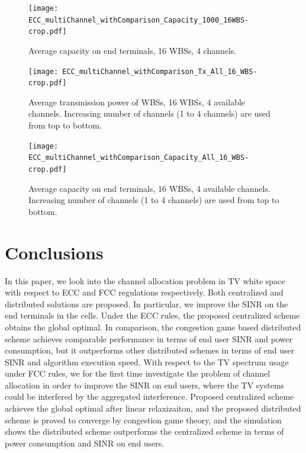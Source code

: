 \documentclass[times]{ettauth}
\theoremstyle{mytheoremstyle}
\theoremstyle{mytheoremstyle}
\theoremstyle{mytheoremstyle}
\begin{document}
       \begin{figure}[h!]
       \centering
       \texttt{[image: ECC\_multiChannel\_withComparison\_Capacity\_1000\_16WBS-crop.pdf]}
       \caption{Average capacity on end terminals,  16 WBSs, 4 channels.}
	\label{ECC_multiChannel_Capacity2}
     \end{figure}
 \begin{figure}[h!]
    \centering
      \texttt{[image: ECC\_multiChannel\_withComparison\_Tx\_All\_16\_WBS-crop.pdf]}
    \caption{Average transmission power of WBSs,  16 WBSs, 4 available channels. Increasing number of channels (1 to 4 channels) are used from top to bottom.}
\label{transPower2_each_cell}    
  \end{figure}
  
       \begin{figure}[h!]
       \centering
       \texttt{[image: ECC\_multiChannel\_withComparison\_Capacity\_All\_16\_WBS-crop.pdf]}
       \caption{Average capacity on end terminals,  16 WBSs, 4 available channels. Increasing number of channels (1 to 4 channels) are used from top to bottom.}
	\label{ECC_multiChannel_Capacity2_each_cell}
     \end{figure}


\section{Conclusions}
In this paper, we look into the channel allocation problem in TV white space with respect to ECC and FCC regulations respectively.
Both centralized and distributed solutions are proposed. 
In particular, we improve the SINR on the end terminals in the cells.
Under the ECC rules, the proposed centralized scheme obtains the global optimal.
In comparison, the congestion game based distributed scheme achieves comparable performance in terms of end user SINR and power consumption, but it outperforms other distributed schemes in terms of end user SINR and algorithm execution speed.
With respect to the TV spectrum usage under FCC rules, we for the first time investigate the problem of channel allocation in order to improve the SINR on end users, where the TV systems could be interfered by the aggregated interference.
Proposed centralized scheme achieves the global optimal after linear relaxizaiton, and the proposed distributed scheme is proved to converge by congestion game theory, and the simulation shows the distributed scheme outperforms the centralized scheme in terms of power consumption and SINR on end users.






\end{document}
